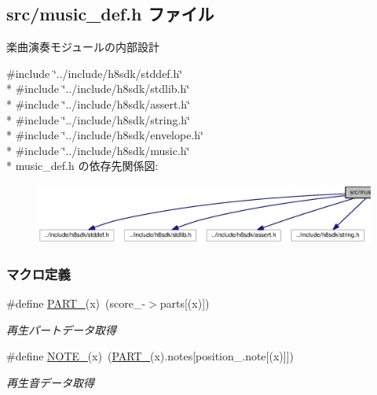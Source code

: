 \subsection{src/music\+\_\+def.h ファイル}
\label{music__def_8h}


楽曲演奏モジュールの内部設計  


{\ttfamily \#include \char`\"{}../include/h8sdk/stddef.\+h\char`\"{}}\\*
{\ttfamily \#include \char`\"{}../include/h8sdk/stdlib.\+h\char`\"{}}\\*
{\ttfamily \#include \char`\"{}../include/h8sdk/assert.\+h\char`\"{}}\\*
{\ttfamily \#include \char`\"{}../include/h8sdk/string.\+h\char`\"{}}\\*
{\ttfamily \#include \char`\"{}../include/h8sdk/envelope.\+h\char`\"{}}\\*
{\ttfamily \#include \char`\"{}../include/h8sdk/music.\+h\char`\"{}}\\*
music\+\_\+def.\+h の依存先関係図\+:\nopagebreak
\begin{figure}[H]
\begin{center}
\leavevmode
\includegraphics[width=350pt]{db/d44/music__def_8h__incl}
\end{center}
\end{figure}
\subsubsection*{マクロ定義}
\begin{DoxyCompactItemize}
\item 
\#define \hyperlink{music__def_8h_aee4ffe661b1b7158886542196a3d060d_aee4ffe661b1b7158886542196a3d060d}{P\+A\+R\+T\+\_\+}(x)~(score\+\_\+-\/$>$parts\mbox{[}(x)\mbox{]})
\begin{DoxyCompactList}\small\item\em 再生パートデータ取得 \end{DoxyCompactList}\item 
\#define \hyperlink{music__def_8h_a00d986cb49450423a34e06c798b9e18c_a00d986cb49450423a34e06c798b9e18c}{N\+O\+T\+E\+\_\+}(x)~(\hyperlink{music__def_8h_aee4ffe661b1b7158886542196a3d060d_aee4ffe661b1b7158886542196a3d060d}{P\+A\+R\+T\+\_\+}(x).notes\mbox{[}position\+\_\+.\+note\mbox{[}(x)\mbox{]}\mbox{]})
\begin{DoxyCompactList}\small\item\em 再生音データ取得 \end{DoxyCompactList}\end{DoxyCompactItemize}


